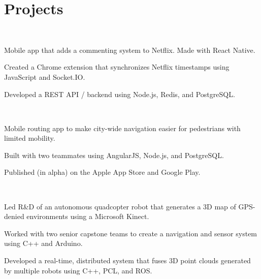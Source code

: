 \documentclass[]{deedy-resume}
\begin{document}
\begin{minipage}[t]{0.61\textwidth}

\section{Projects}
 \\
\begin{tightemize}
\item Mobile app that adds a commenting system to Netflix. Made with React Native.
\item Created a Chrome extension that synchronizes Netflix timestamps using JavaScript and Socket.IO.
\item Developed a REST API / backend using Node.js, Redis, and PostgreSQL.
\end{tightemize}
\sectionsep

 \\
\begin{tightemize}
\item Mobile routing app to make city-wide navigation easier for pedestrians with limited mobility.
\item Built with two teammates using AngularJS, Node.js, and PostgreSQL.
\item Published (in alpha) on the Apple App Store and Google Play.
\end{tightemize}
\sectionsep

 \\
\begin{tightemize}
\item Led R\&D of an autonomous quadcopter robot that generates a 3D map of GPS-denied environments using a Microsoft Kinect.
\item Worked with two senior capstone teams to create a navigation and sensor system using C++ and Arduino.
\item Developed a real-time, distributed system that fuses 3D point clouds generated by multiple robots using C++, PCL, and ROS.
\end{tightemize}
\sectionsep

\end{minipage}
\end{document}
